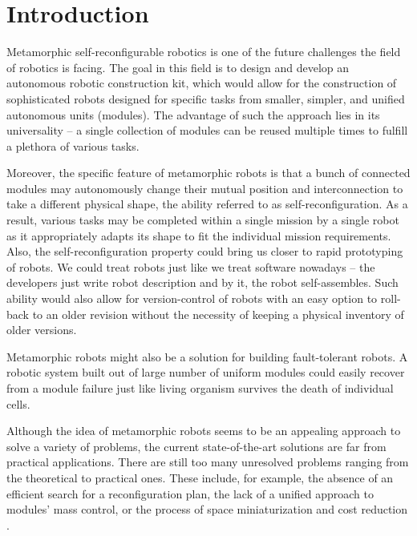 \chapter{Introduction}\label{chap:introduciton}

Metamorphic self-reconfigurable robotics is one of the future challenges the
field of robotics is facing. The goal in this field is to design and develop an
autonomous robotic construction kit, which would allow for the construction of
sophisticated robots designed for specific tasks from smaller, simpler, and
unified autonomous units (modules). The advantage of such the approach lies in
its universality -- a single collection of modules can be reused multiple times
to fulfill a plethora of various tasks.

Moreover, the specific feature of metamorphic robots is that a bunch of
connected modules may autonomously change their mutual position and
interconnection to take a different physical shape, the ability referred to as
self-reconfiguration. As a result, various tasks may be completed within a
single mission by a single robot as it appropriately adapts its shape to fit the
individual mission requirements. Also, the self-reconfiguration property could
bring us closer to rapid prototyping of robots. We could treat robots just like
we treat software nowadays -- the developers just write robot description and by
 it, the robot self-assembles. Such ability would also allow for
version-control of robots with an easy option to roll-back to an older revision
without the necessity of keeping a physical inventory of older versions.

Metamorphic robots might also be a solution for building fault-tolerant robots.
A robotic system built out of large number of uniform modules could easily
recover from a module failure just like living organism survives the death of
individual cells.

Although the idea of metamorphic robots seems to be an appealing approach to
solve a variety of problems, the current state-of-the-art solutions are far from
practical applications. There are still too many unresolved problems ranging
from the theoretical to practical ones. These include, for example, the absence
of an efficient search for a reconfiguration plan, the lack of a unified
approach to modules' mass control, or the process of space miniaturization and
cost reduction \cite{4141032}.

